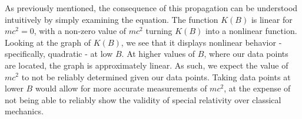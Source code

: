 As previously mentioned, the consequence of this propagation can be understood intuitively by simply examining the equation. The function $K(B)$ is linear for $mc^2 = 0$, with a non-zero value of $mc^2$ turning $K(B)$ into a nonlinear function. Looking at the graph of $K(B)$, we see that it displays nonlinear behavior - specifically, quadratic - at low $B$. At higher values of $B$, where our data points are located, the graph is approximately linear. As such, we expect the value of $mc^2$ to not be reliably determined given our data points. Taking data points at lower $B$ would allow for more accurate measurements of $mc^2$, at the expense of not being able to reliably show the validity of special relativity over classical mechanics.






